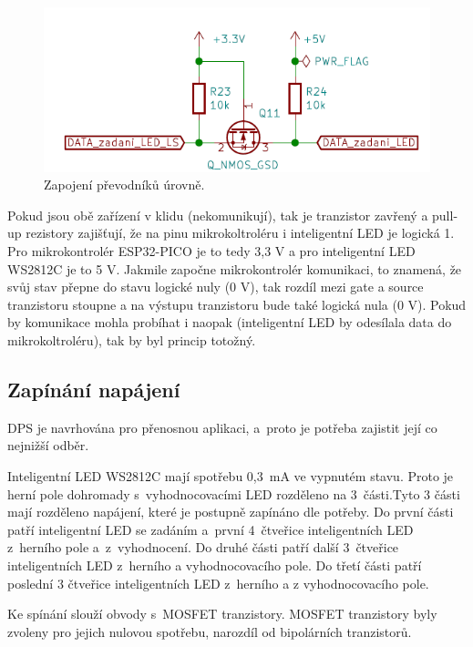   \begin{figure}[!h]
    \begin{center}
      \includegraphics[scale=0.9]{obrazky/level_shifter.png}
    \end{center}
    \caption[Zapojení převodníků úrovně]{Zapojení převodníků úrovně.}
  \end{figure}

  Pokud jsou obě zařízení v klidu (nekomunikují), tak je tranzistor zavřený a pull-up rezistory zajišťují, že na pinu mikrokoltroléru
  i inteligentní LED je logická 1. Pro mikrokontrolér ESP32-PICO je to tedy 3,3 V a pro inteligentní LED WS2812C je to 5 V. Jakmile započne
  mikrokontrolér komunikaci, to znamená, že svůj stav přepne do stavu logické nuly (0 V), tak rozdíl mezi gate a source tranzistoru stoupne
  a na výstupu tranzistoru bude také logická nula (0 V). Pokud by komunikace mohla probíhat i naopak (inteligentní LED by odesílala data do
  mikrokoltroléru), tak by byl princip totožný. 

  \subsection{Zapínání napájení}
  DPS je navrhována pro přenosnou aplikaci, a~proto je potřeba zajistit její co nejnižší odběr. 

  Inteligentní LED WS2812C mají spotřebu 0,3~mA ve vypnutém stavu. Proto je herní pole dohromady
  s~vyhodnocovacími LED rozděleno na 3~části.Tyto 3 části mají rozděleno napájení, které je postupně zapínáno dle potřeby. 
  Do první části patří inteligentní LED se zadáním a~první 4~čtveřice inteligentních LED 
  z~herního pole a~z~vyhodnocení. Do druhé části patří další 3~čtveřice inteligentních LED z~herního a vyhodnocovacího pole. 
  Do třetí části patří poslední 3 čtveřice inteligentních LED z~herního a z vyhodnocovacího pole.

  Ke spínání slouží obvody s~MOSFET tranzistory. MOSFET tranzistory byly zvoleny pro jejich nulovou spotřebu, narozdíl od 
  bipolárních tranzistorů. 

